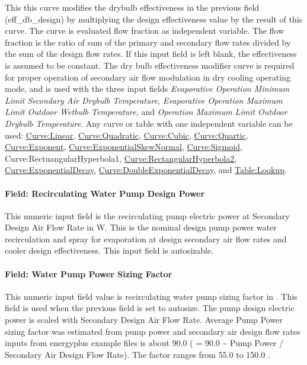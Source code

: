 This this curve modifies the drybulb effectiveness in the previous field (eff\_db\_design) by multiplying the design effectiveness value by the result of this curve. The curve is evaluated flow fraction as independent variable. The flow fraction is the ratio of sum of the primary and secondary flow rates divided by the sum of the design flow rates. If this input field is left blank, the effectiveness is assumed to be constant. The dry bulb effectiveness modifier curve is required for proper operation of secondary air flow modulation in dry cooling operating mode, and is used with the three input fields \textit{Evaporative Operation Minimum Limit Secondary Air Drybulb Temperature}, \textit{Evaporative Operation Maximum Limit Outdoor Wetbulb Temperature}, and \textit{Operation Maximum Limit Outdoor Drybulb Temperature}. Any curve or table with one independent variable can be used: \hyperref[curvelinear]{Curve:Linear}, \hyperref[curvequadratic]{Curve:Quadratic}, \hyperref[curvecubic]{Curve:Cubic}, \hyperref[curvequartic]{Curve:Quartic}, \hyperref[curveexponent]{Curve:Exponent}, \hyperref[curveexponentialskewnormal]{Curve:ExponentialSkewNormal}, \hyperref[curvesigmoid]{Curve:Sigmoid}, Curve:RectuangularHyperbola1, \hyperref[curverectangularhyperbola2]{Curve:RectangularHyperbola2}, \hyperref[curveexponentialdecay]{Curve:ExponentialDecay}, \hyperref[curvedoubleexponentialdecay]{Curve:DoubleExponentialDecay}, and \hyperref[tablelookup]{Table:Lookup}.

\paragraph{Field: Recirculating Water Pump Design Power}\label{field-recirculating-water-pump-design-power}

This numeric input field is the recirculating pump electric power at Secondary Design Air Flow Rate in W. This is the nominal design pump power water recirculation and spray for evaporation at design secondary air flow rates and cooler design effectiveness. This input field is autosizable.

\paragraph{Field: Water Pump Power Sizing Factor}\label{field-water-pump-power-sizing-factor-1}

This numeric input field value is recirculating water pump sizing factor in \si{\wattperVolumeFlowRate}. This field is used when the previous field is set to autosize. The pump design electric power is scaled with Secondary Design Air Flow Rate. Average Pump Power sizing factor was estimated from pump power and secondary air design flow rates inputs from energyplus example files is about 90.0 \si{\wattperVolumeFlowRate} ( = 90.0 \textasciitilde{} Pump Power / Secondary Air Design Flow Rate). The factor ranges from 55.0 to 150.0 \si{\wattperVolumeFlowRate}.


